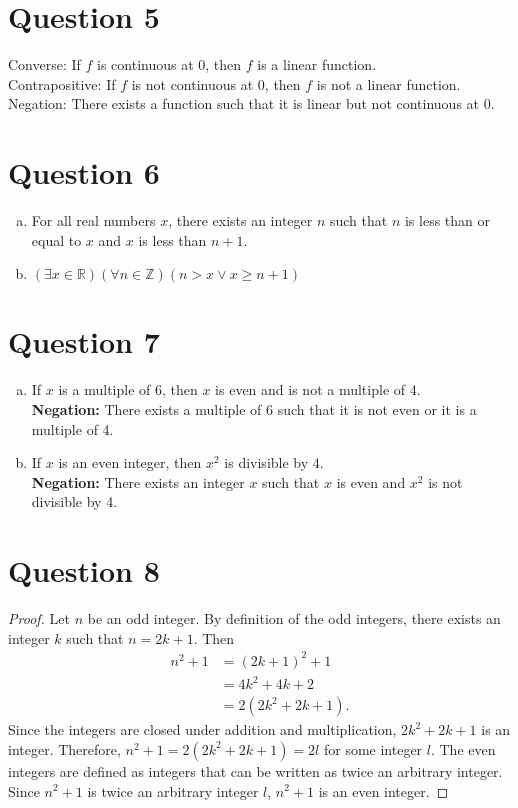\documentclass{article}
\begin{document}
\section*{Question 5}
Converse: If $f$ is continuous at 0, then $f$ is a linear function. \\
Contrapositive: If $f$ is not continuous at 0, then $f$ is not a linear function. \\
Negation: There exists a function such that it is linear but not continuous at 0. \\

\section*{Question 6}
\begin{enumerate}[(a)]
    \item For all real numbers $x$, there exists an integer $n$ such that $n$ is less than or equal to $x$ and $x$ is less than $n+1$.
    \item $(\exists x \in \mathbb{R}) (\forall n \in \mathbb{Z}) (n > x \lor x \geq n + 1)$
\end{enumerate}

\section*{Question 7}
\begin{enumerate}[(a)]
    \item If $x$ is a multiple of 6, then $x$ is even and is not a multiple of 4. \\
        \textbf{Negation:} There exists a multiple of 6 such that it is not even or it is a multiple of 4.
    \item If $x$ is an even integer, then $x^2$ is divisible by 4. \\
        \textbf{Negation:} There exists an integer $x$ such that $x$ is even and $x^2$ is not divisible by 4.
\end{enumerate}

\section*{Question 8}
\begin{proof}
    Let $n$ be an odd integer.
    By definition of the odd integers, there exists an integer $k$ such that $n = 2k + 1$.
    Then \begin{align*}
        n^2 + 1 &= (2k + 1)^2 + 1 \\
                &= 4k^2 + 4k + 2 \\
                &= 2(2k^2 + 2k + 1).
    \end{align*}
    Since the integers are closed under addition and multiplication, $2k^2 + 2k + 1$ is an integer.
    Therefore, $n^2 + 1 = 2(2k^2 + 2k + 1) = 2l$ for some integer $l$.
    The even integers are defined as integers that can be written as twice an arbitrary integer.
    Since $n^2 + 1$ is twice an arbitrary integer $l$, $n^2 + 1$ is an even integer.
\end{proof}
\end{document}
